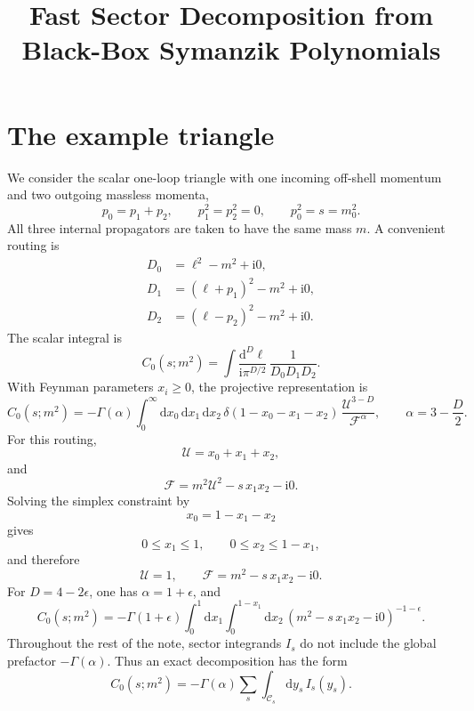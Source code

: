 \documentclass[11pt]{article}
\title{Fast Sector Decomposition from Black-Box Symanzik Polynomials}
\author{}
\date{}
\newcommand{\dd}{\mathrm d}
\newcommand{\ii}{\mathrm i}
\newcommand{\eps}{\epsilon}
\newcommand{\U}{\mathcal U}
\newcommand{\F}{\mathcal F}
\begin{document}
\maketitle

\section{The example triangle}

We consider the scalar one-loop triangle with one incoming off-shell momentum
and two outgoing massless momenta,
\begin{equation}
  p_0=p_1+p_2,
  \qquad
  p_1^2=p_2^2=0,
  \qquad
  p_0^2=s=m_0^2 .
\end{equation}
All three internal propagators are taken to have the same mass \(m\).  A
convenient routing is
\begin{align}
  D_0 &= \ell^2-m^2+\ii0,\\
  D_1 &= (\ell+p_1)^2-m^2+\ii0,\\
  D_2 &= (\ell-p_2)^2-m^2+\ii0 .
\end{align}
The scalar integral is
\begin{equation}
  C_0(s;m^2)
  =
  \int \frac{\dd^D\ell}{\ii\pi^{D/2}}\,
  \frac{1}{D_0D_1D_2}.
\end{equation}
With Feynman parameters \(x_i\geq 0\), the projective representation is
\begin{equation}
  C_0(s;m^2)
  =
  -\Gamma(\alpha)
  \int_0^\infty \dd x_0\,\dd x_1\,\dd x_2\,
  \delta(1-x_0-x_1-x_2)\,
  \frac{\U^{3-D}}{\F^\alpha},
  \qquad
  \alpha=3-\frac{D}{2}.
\end{equation}
For this routing,
\begin{equation}
  \U=x_0+x_1+x_2,
\end{equation}
and
\begin{equation}
  \F
  =
  m^2\U^2
  -
  s\,x_1x_2
  -
  \ii0 .
\end{equation}
Solving the simplex constraint by
\begin{equation}
  x_0=1-x_1-x_2
\end{equation}
gives
\begin{equation}
  0\leq x_1\leq 1,
  \qquad
  0\leq x_2\leq 1-x_1,
\end{equation}
and therefore
\begin{equation}
  \U=1,
  \qquad
  \F=m^2-s\,x_1x_2-\ii0 .
\end{equation}
For \(D=4-2\eps\), one has \(\alpha=1+\eps\), and
\begin{equation}
  C_0(s;m^2)
  =
  -\Gamma(1+\eps)
  \int_0^1 \dd x_1
  \int_0^{1-x_1} \dd x_2\,
  \left(m^2-s\,x_1x_2-\ii0\right)^{-1-\eps}.
\end{equation}
Throughout the rest of the note, sector integrands \(I_s\) do not include the
global prefactor \(-\Gamma(\alpha)\).  Thus an exact decomposition has the form
\begin{equation}
  C_0(s;m^2)
  =
  -\Gamma(\alpha)
  \sum_s
  \int_{\mathcal C_s}\dd y_s\,
  I_s(y_s).
\end{equation}
\end{document}
